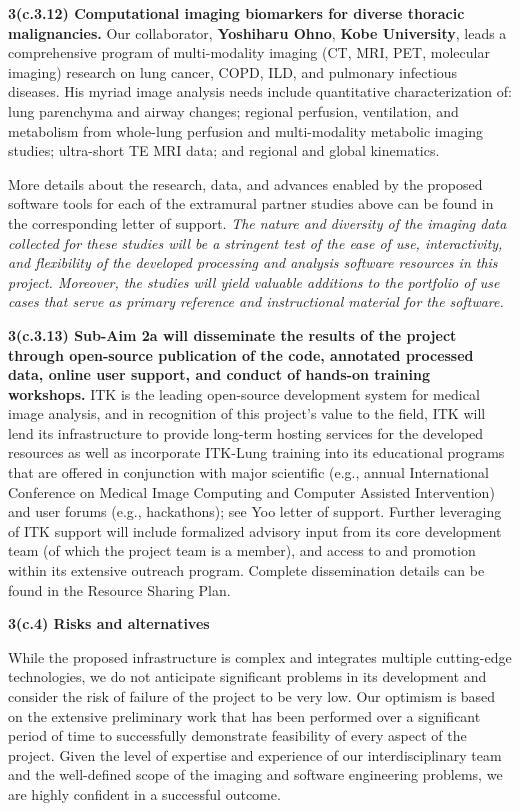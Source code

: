 \documentclass[11pt,]{article}
\begin{document}
\textbf{3(c.3.12) Computational imaging biomarkers for diverse thoracic
malignancies.} Our collaborator, \textbf{Yoshiharu Ohno}, \textbf{Kobe
University}, leads a comprehensive program of multi-modality imaging
(CT, MRI, PET, molecular imaging) research on lung cancer, COPD, ILD,
and pulmonary infectious diseases. His myriad image analysis needs
include quantitative characterization of: lung parenchyma and airway
changes; regional perfusion, ventilation, and metabolism from whole-lung
perfusion and multi-modality metabolic imaging studies; ultra-short TE
MRI data; and regional and global kinematics.

More details about the research, data, and advances enabled by the
proposed software tools for each of the extramural partner studies above
can be found in the corresponding letter of support. \emph{The nature
and diversity of the imaging data collected for these studies will be a
stringent test of the ease of use, interactivity, and flexibility of the
developed processing and analysis software resources in this project.
Moreover, the studies will yield valuable additions to the portfolio of
use cases that serve as primary reference and instructional material for
the software.}

\textbf{3(c.3.13) Sub-Aim 2a will disseminate the results of the project
through open-source publication of the code, annotated processed data,
online user support, and conduct of hands-on training workshops.} ITK is
the leading open-source development system for medical image analysis,
and in recognition of this project's value to the field, ITK will lend
its infrastructure to provide long-term hosting services for the
developed resources as well as incorporate ITK-Lung training into its
educational programs that are offered in conjunction with major
scientific (e.g., annual International Conference on Medical Image
Computing and Computer Assisted Intervention) and user forums (e.g.,
hackathons); see Yoo letter of support. Further leveraging of ITK
support will include formalized advisory input from its core development
team (of which the project team is a member), and access to and
promotion within its extensive outreach program. Complete dissemination
details can be found in the Resource Sharing Plan.

\textbf{3(c.4) Risks and alternatives}

While the proposed infrastructure is complex and integrates multiple
cutting-edge technologies, we do not anticipate significant problems in
its development and consider the risk of failure of the project to be
very low. Our optimism is based on the extensive preliminary work that
has been performed over a significant period of time to successfully
demonstrate feasibility of every aspect of the project. Given the level
of expertise and experience of our interdisciplinary team and the
well-defined scope of the imaging and software engineering problems, we
are highly confident in a successful outcome.
\end{document}
